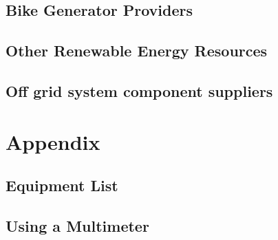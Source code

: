 \documentclass{article}
\theoremstyle{definition}
\theoremstyle{definition}
\theoremstyle{remark}
\begin{document}
  \subsection{Bike Generator Providers} %
  \label{sub:bike_generator_providers}
  

  \subsection{Other Renewable Energy Resources} %
  \label{sub:other_renewable_energy_resources}
  

  \subsection{Off grid system component suppliers} %
  \label{sub:off_grid_system_component_suppliers}
  


\newpage

\section{Appendix} %
\label{sec:appendix}

  \subsection{Equipment List} %
  \label{sub:equipment_list}
  

  \subsection{Using a Multimeter} %
  \label{sub:using_a_multimeter}
  

\end{document}
